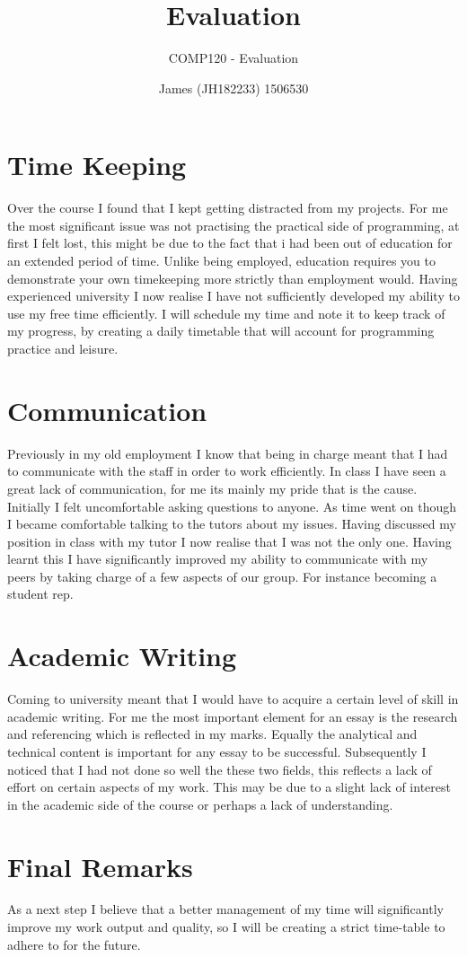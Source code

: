 \documentclass{scrartcl}
\title{Evaluation}
\subtitle{COMP120 - Evaluation}
\author{James (JH182233) 1506530}
\begin{document}
\maketitle

\section{Time Keeping}

Over the course I found that I kept getting distracted from my projects. For me the most significant issue was not practising the practical side of programming, at first I felt lost, this might be due to the fact that i had been out of education for an extended period of time. Unlike being employed, education requires you to demonstrate your own timekeeping more strictly than employment would. Having experienced university I now realise I have not sufficiently developed my ability to use my free time efficiently. I will schedule my time and note it to keep track of my progress, by creating a daily timetable that will account for programming practice and leisure.

\section{Communication}

Previously in my old employment I know that being in charge meant that I had to communicate with the staff in order to work efficiently. In class I have seen a great lack of communication, for me its mainly my pride that is the cause. Initially I felt uncomfortable asking questions to anyone. As time went on though I became comfortable talking to the tutors about my issues. Having discussed my position in class with my tutor I now realise that I was not the only one. Having learnt this I have significantly improved my ability to communicate with my peers by taking charge of a few aspects of our group. For instance becoming a student rep. 

\section{Academic Writing}

Coming to university meant that I would have to acquire a certain level of skill in academic writing. For me the most important element for an essay is the research and referencing which is reflected in my marks. Equally the analytical and technical content is important for any essay to be successful. Subsequently I noticed that I had not done so well the these two fields, this reflects a lack of effort on certain aspects of my work. This may be due to a slight lack of interest in the academic side of the course or perhaps a lack of understanding.

\section{Final Remarks}

As a next step I believe that a better management of my time will significantly improve my work output and quality, so I will be creating a strict time-table to adhere to for the future.



\end{document}
